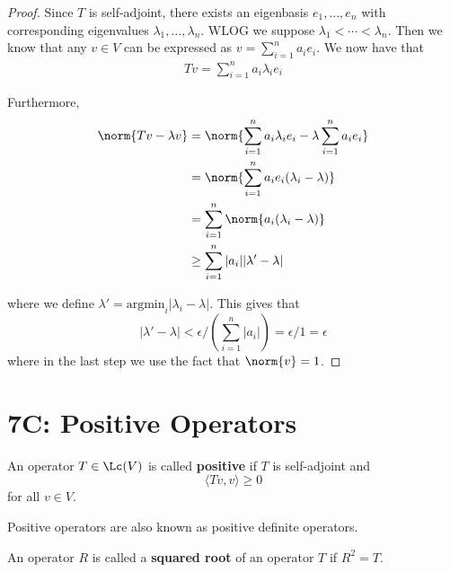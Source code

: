 \documentclass{extarticle}
\begin{document}
\begin{proof}
Since \(T\) is self-adjoint, there exists an eigenbasis \(e_1, \ldots, e_n\) with corresponding
eigenvalues \(\lambda_1, \ldots, \lambda_n\). WLOG we suppose \(\lambda_1 < \cdots < \lambda_n\). Then
we know that any \(v \in V\) can be expressed as \(v = \sum_{i=1}^{n} a_i e_i\). We now have that
\begin{align*}
    Tv = \sum_{i=1}^{n} a_i \lambda_i e_i
\end{align*}

Furthermore,
\begin{align*}
    \norm{Tv - \lambda v}
    &= \norm{ \sum_{i=1}^{n} a_i \lambda_i e_i  - \lambda \sum_{i=1}^{n} a_i e_i } \\
    &= \norm{ \sum_{i=1}^{n} a_i e_i (\lambda_i - \lambda)} \\
    &= \sum_{i=1}^{n} \norm{a_i (\lambda_i - \lambda)} \\
    &\geq \sum_{i=1}^{n} |a_i| |\lambda' - \lambda|
\end{align*}

where we define \(\lambda' = \text{argmin}_i |\lambda_i - \lambda| \). This gives that
\[|\lambda' - \lambda| < \epsilon / \left(\sum_{i=1}^{n} |a_i|\right) = \epsilon / 1 = \epsilon\]
where in the last step we use the fact that \(\norm{v} = 1\).
\end{proof}


\newpage
\section*{7C: Positive Operators}

\begin{definition}
    An operator \(T \in \Lc(V)\) is called \textbf{positive} if \(T\) is self-adjoint and
    \[\langle Tv,v \rangle \geq 0\]
    for all \(v \in V\).
\end{definition}

\begin{remark}
    Positive operators are also known as positive definite operators.
\end{remark}

\begin{definition}
    An operator \(R\) is called a \textbf{squared root} of an operator \(T\) if \(R^2 = T\).
\end{definition}
\end{document}
